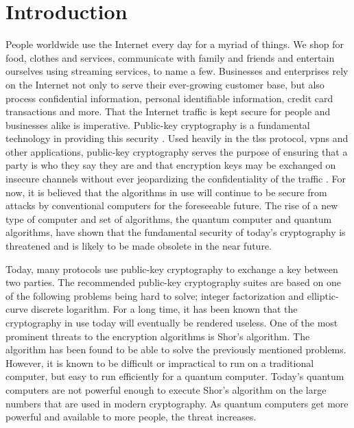\chapter{Introduction}
\label{chapter:introduction}




People worldwide use the Internet every day for a myriad of things. We shop for food, clothes and services, communicate with family and friends and entertain ourselves using streaming services, to name a few. Businesses and enterprises rely on the Internet not only to serve their ever-growing customer base, but also process confidential information, personal identifiable information, credit card transactions and more. That the Internet traffic is kept secure for people and businesses alike is imperative. Public-key cryptography is a fundamental technology in providing this security \cite{rfc8446}. Used heavily in the \glspl{tls} protocol, \glspl{vpn} and other applications, public-key cryptography serves the purpose of ensuring that a party is who they say they are and that encryption keys may be exchanged on insecure channels without ever jeopardizing the confidentiality of the traffic \cite{rfc8446}. For now, it is believed that the algorithms in use will continue to be secure from attacks by conventional computers for the foreseeable future. The rise of a new type of computer and set of algorithms, the quantum computer and quantum algorithms, have shown that the fundamental security of today's cryptography is threatened and is likely to be made obsolete in the near future.

Today, many protocols use public-key cryptography to exchange a key between two parties. The recommended public-key cryptography suites are based on one of the following problems being hard to solve; integer factorization and elliptic-curve discrete logarithm\cite{nsa2015, nist2019}. For a long time, it has been known that the cryptography in use today will eventually be rendered useless. One of the most prominent threats to the encryption algorithms is Shor's algorithm\cite{shor1997}. The algorithm has been found to be able to solve the previously mentioned problems. However, it is known to be difficult or impractical to run on a traditional computer, but easy to run efficiently for a quantum computer. Today's quantum computers are not powerful enough to execute Shor's algorithm on the large numbers that are used in modern cryptography. As quantum computers get more powerful and available to more people, the threat increases.

